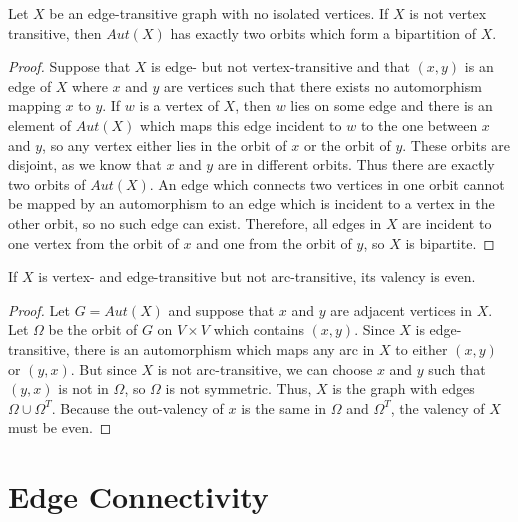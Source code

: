 \begin{lemma}
	Let $X$ be an edge-transitive graph with no isolated vertices.  If $X$ is not vertex transitive, then $Aut(X)$ has exactly two orbits which form a bipartition of $X$.
\end{lemma}
\begin{proof}
	Suppose that $X$ is edge- but not vertex-transitive and that $(x,y)$ is an edge of $X$ where $x$ and $y$ are vertices such that there exists no automorphism mapping $x$ to $y$.  If $w$ is a vertex of $X$, then $w$ lies on some edge and there is an element of $Aut(X)$ which maps this edge incident to $w$ to the one between $x$ and $y$, so any vertex either lies in the orbit of $x$ or the orbit of $y$.  These orbits are disjoint, as we know that $x$ and $y$ are in different orbits.  Thus there are exactly two orbits of $Aut(X)$.  An edge which connects two vertices in one orbit cannot be mapped by an automorphism to an edge which is incident to a vertex in the other orbit, so no such edge can exist.  Therefore, all edges in $X$ are incident to one vertex from the orbit of $x$ and one from the orbit of $y$, so $X$ is bipartite.
	
	
\end{proof}

\begin{lemma}
	If $X$ is vertex- and edge-transitive but not arc-transitive, its valency is even.
\end{lemma}

\begin{proof}
	Let $G=Aut(X)$ and suppose that $x$ and $y$ are adjacent vertices in $X$.  Let $\Omega$ be the orbit of $G$ on $V\times V$ which contains $(x,y)$.  Since $X$ is edge-transitive, there is an automorphism which maps any arc in $X$ to either $(x,y)$ or $(y,x)$. But since $X$ is not arc-transitive, we can choose $x$ and $y$ such that  $(y,x)$ is not in $\Omega$, so $\Omega$ is not symmetric.  Thus, $X$ is the graph with edges $\Omega\cup\Omega^T$.  Because the out-valency of $x$ is the same in $\Omega$ and $\Omega^T$, the valency of $X$ must be even.
\end{proof}



\section*{Edge Connectivity}

